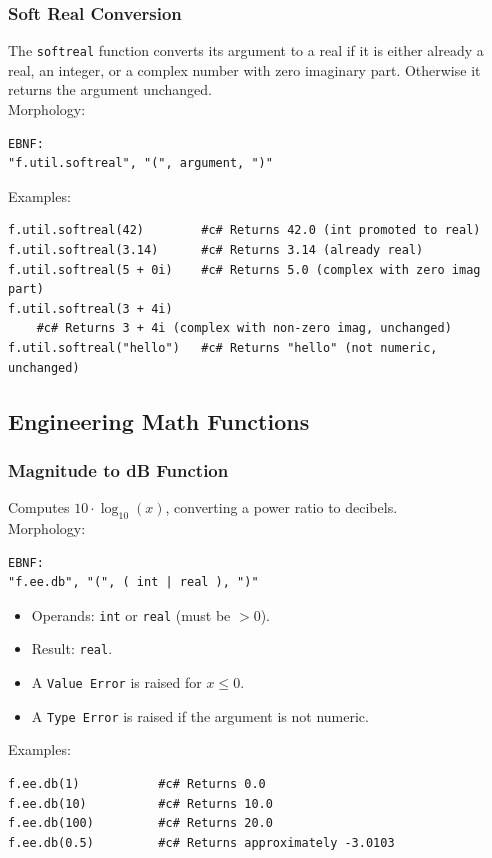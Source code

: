 \subsubsection{Soft Real Conversion}
The \texttt{softreal} function converts its argument to a real if it is either already a real, an integer, or a complex number with zero imaginary part. Otherwise it returns the argument unchanged. \\
Morphology:
\begin{verbatim}
EBNF:
"f.util.softreal", "(", argument, ")"
\end{verbatim}
Examples:
\begin{verbatim}
f.util.softreal(42)        #c# Returns 42.0 (int promoted to real)
f.util.softreal(3.14)      #c# Returns 3.14 (already real)
f.util.softreal(5 + 0i)    #c# Returns 5.0 (complex with zero imag part)
f.util.softreal(3 + 4i)
    #c# Returns 3 + 4i (complex with non-zero imag, unchanged)
f.util.softreal("hello")   #c# Returns "hello" (not numeric, unchanged)
\end{verbatim}

\subsection{Engineering Math Functions}

\subsubsection{Magnitude to dB Function}
Computes $10 \cdot \log_{10}(x)$, converting a power ratio to decibels. \\
Morphology:
\begin{verbatim}
EBNF:
"f.ee.db", "(", ( int | real ), ")"
\end{verbatim}
\begin{itemize}
\item Operands: \texttt{int} or \texttt{real} (must be $> 0$).
\item Result: \texttt{real}.
\item A \texttt{Value Error} is raised for $x \leq 0$.
\item A \texttt{Type Error} is raised if the argument is not numeric.
\end{itemize}
Examples:
\begin{verbatim}
f.ee.db(1)           #c# Returns 0.0
f.ee.db(10)          #c# Returns 10.0
f.ee.db(100)         #c# Returns 20.0
f.ee.db(0.5)         #c# Returns approximately -3.0103
\end{verbatim}

